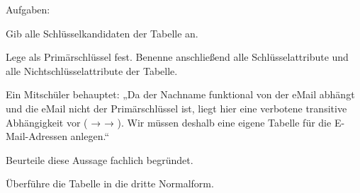 Aufgaben:

\begin{compactitem}
\item[a)] Gib alle Schlüsselkandidaten der Tabelle  an.
\item[b)] Lege  als Primärschlüssel fest. Benenne 
anschließend alle Schlüsselattribute und alle Nichtschlüsselattribute der Tabelle.
\item[c)] Ein Mitschüler behauptet: „Da der Nachname funktional von der eMail 
abhängt und die eMail nicht der Primärschlüssel ist, liegt hier eine verbotene 
transitive Abhängigkeit vor ( →  
→ ). Wir müssen deshalb eine eigene Tabelle für die 
E-Mail-Adressen anlegen.“

Beurteile diese Aussage fachlich begründet.
\item[d)] Überführe die Tabelle  in die dritte Normalform.
\end{compactitem}

